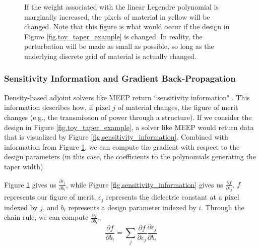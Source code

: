 \documentclass[12pt]{article}
\begin{document}
\begin{figure}
\caption{If the weight associated with the linear Legendre polynomial is marginally increased, the pixels of material in yellow will be changed. Note that this figure is what would occur if the design in Figure \ref{fig.toy_taper_example} is changed. In reality, the perturbation will be made as small as possible, so long as the underlying discrete grid of material is actually changed.}
\label{fig.design_perturbation}
\end{figure}

\subsubsection{Sensitivity Information and Gradient Back-Propagation}\label{sec.adjoint}
Density-based adjoint solvers like MEEP return ``sensitivity information" \cite{meep_adjoint}. This information describes how, if pixel $j$ of material changes, the figure of merit changes (e.g., the transmission of power through a structure). If we consider the design in Figure \ref{fig.toy_taper_example}, a solver like MEEP would return data that is visualized by Figure \ref{fig.sensitivity_information}. Combined with information from Figure \ref{fig.design_perturbation}, we can compute the gradient with respect to the design parameters (in this case, the coefficients to the polynomials generating the taper width).

Figure \ref{fig.design_perturbation} gives us $\frac{\partial \epsilon_j}{\partial b_i}$, while Figure \ref{fig.sensitivity_information} gives us $\frac{\partial f}{\partial \epsilon_j}$. $f$ represents our figure of merit, $\epsilon_j$ represents the dielectric constant at a pixel indexed by $j$, and $b_i$ represents a design parameter indexed by $i$. Through the chain rule, we can compute $\frac{\partial f}{\partial b_i}$.
\begin{equation}
\frac{\partial f}{\partial b_i} = \sum_j \frac{\partial f}{\partial \epsilon_j} \frac{\partial \epsilon_j}{\partial b_i}
\end{equation}
\end{document}
